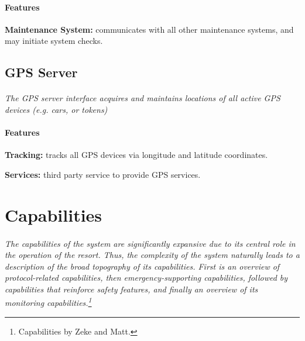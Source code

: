 \documentclass[12pt]{article}
\begin{document}
    \paragraph{Features}
    \begin{list}{}{}
        \item \textbf{Maintenance System:} communicates with all other maintenance systems,
        and may initiate system checks. 
    \end{list}

    \subsection{GPS Server}
    \paragraph{} \textit{The GPS server interface acquires and maintains locations of all 
    active GPS devices (e.g. cars, or tokens)}        
    
    \paragraph{Features}
    \begin{list}{}{}
        \item \textbf{Tracking:} tracks all GPS devices via longitude and latitude coordinates.
        \item \textbf{Services:} third party service to provide GPS services.
    \end{list}

\section{Capabilities}
\label{cap}
\paragraph{}\textit{The capabilities of the system are significantly expansive due to its central role
in the operation of the resort. Thus, the complexity of the system naturally leads to a description
of the broad topography of its capabilities. First is an overview of protocol-related capabilities, then
emergency-supporting capabilities, followed by capabilities that reinforce safety features, and finally an 
overview of its monitoring capabilities.\footnote {Capabilities by Zeke and Matt.}}
\end{document}
